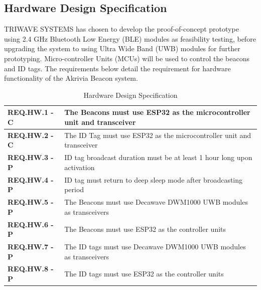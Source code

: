 \pagebreak
\subsection{Hardware Design Specification}
\medskip
TRIWAVE SYSTEMS has chosen to develop the proof-of-concept prototype using 2.4 GHz Bluetooth Low Energy (BLE) modules as feasibility testing, before upgrading the system to using Ultra Wide Band (UWB) modules for further prototyping. Micro-controller Units (MCUs) will be used to control the beacons and ID tags. The requirements below detail the requirement for hardware functionality of the Akrivia Beacon system.
\medskip
\bgroup
\def\arraystretch{1.5}
\begin{table}[H]
\centering
\begin{tabular}{ | m{3cm} | m{12.5cm} |}
\hline
\textbf{REQ.HW.1 - C} & The Beacons must use ESP32 as the microcontroller unit and transceiver \\
\hline
\textbf{REQ.HW.2 - C} & The ID Tag must use ESP32 as the microcontroller unit and transceiver \\
\hline
\textbf{REQ.HW.3 - P} & ID tag broadcast duration must be at least 1 hour long upon activation\\
\hline
\textbf{REQ.HW.4 - P} & ID tag must return to deep sleep mode after broadcasting period\\
\hline
\textbf{REQ.HW.5 - P} & The Beacons must use Decawave DWM1000 UWB modules as transceivers\\
\hline
\textbf{REQ.HW.6 - P} & The Beacons must use ESP32 as the controller units\\
\hline
\textbf{REQ.HW.7 - P} & The ID tags must use Decawave DWM1000 UWB modules as transceivers\\
\hline
\textbf{REQ.HW.8 - P} & The ID tags must use ESP32 as the controller units\\
\hline
\end{tabular}
\caption{Hardware Design Specification}
\end{table}







